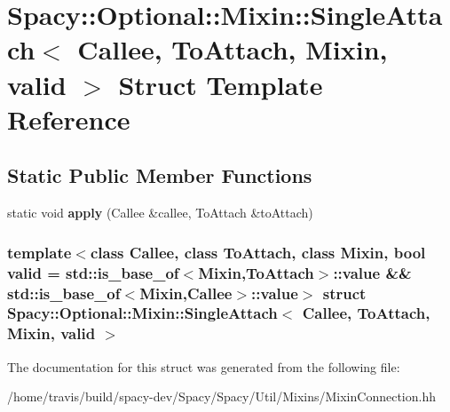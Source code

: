 \hypertarget{structSpacy_1_1Optional_1_1Mixin_1_1SingleAttach}{\section{\-Spacy\-:\-:\-Optional\-:\-:\-Mixin\-:\-:\-Single\-Attach$<$ \-Callee, \-To\-Attach, \-Mixin, valid $>$ \-Struct \-Template \-Reference}
\label{structSpacy_1_1Optional_1_1Mixin_1_1SingleAttach}
}
\subsection*{\-Static \-Public \-Member \-Functions}
\begin{DoxyCompactItemize}
\item 
\hypertarget{structSpacy_1_1Optional_1_1Mixin_1_1SingleAttach_a52061c5546bfd2d59ad15881dda8a01d}{static void {\bfseries apply} (\-Callee \&callee, \-To\-Attach \&to\-Attach)}\label{structSpacy_1_1Optional_1_1Mixin_1_1SingleAttach_a52061c5546bfd2d59ad15881dda8a01d}

\end{DoxyCompactItemize}
\subsubsection*{template$<$class Callee, class To\-Attach, class Mixin, bool valid = std\-::is\-\_\-base\-\_\-of$<$\-Mixin,\-To\-Attach$>$\-::value \&\& std\-::is\-\_\-base\-\_\-of$<$\-Mixin,\-Callee$>$\-::value$>$ struct Spacy\-::\-Optional\-::\-Mixin\-::\-Single\-Attach$<$ Callee, To\-Attach, Mixin, valid $>$}



\-The documentation for this struct was generated from the following file\-:\begin{DoxyCompactItemize}
\item 
/home/travis/build/spacy-\/dev/\-Spacy/\-Spacy/\-Util/\-Mixins/\-Mixin\-Connection.\-hh\end{DoxyCompactItemize}
